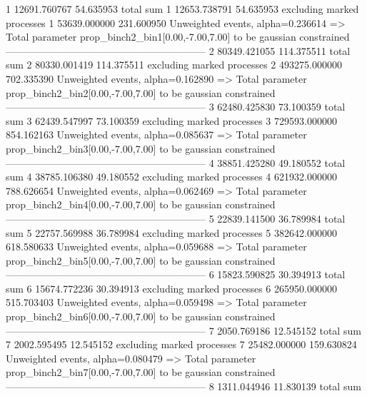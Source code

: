 1          12691.760767    54.635953       total sum                     
1          12653.738791    54.635953       excluding marked processes    
1          53639.000000    231.600950      Unweighted events, alpha=0.236614
  => Total parameter prop_binch2_bin1[0.00,-7.00,7.00] to be gaussian constrained
------------------------------------------------------------
2          80349.421055    114.375511      total sum                     
2          80330.001419    114.375511      excluding marked processes    
2          493275.000000   702.335390      Unweighted events, alpha=0.162890
  => Total parameter prop_binch2_bin2[0.00,-7.00,7.00] to be gaussian constrained
------------------------------------------------------------
3          62480.425830    73.100359       total sum                     
3          62439.547997    73.100359       excluding marked processes    
3          729593.000000   854.162163      Unweighted events, alpha=0.085637
  => Total parameter prop_binch2_bin3[0.00,-7.00,7.00] to be gaussian constrained
------------------------------------------------------------
4          38851.425280    49.180552       total sum                     
4          38785.106380    49.180552       excluding marked processes    
4          621932.000000   788.626654      Unweighted events, alpha=0.062469
  => Total parameter prop_binch2_bin4[0.00,-7.00,7.00] to be gaussian constrained
------------------------------------------------------------
5          22839.141500    36.789984       total sum                     
5          22757.569988    36.789984       excluding marked processes    
5          382642.000000   618.580633      Unweighted events, alpha=0.059688
  => Total parameter prop_binch2_bin5[0.00,-7.00,7.00] to be gaussian constrained
------------------------------------------------------------
6          15823.590825    30.394913       total sum                     
6          15674.772236    30.394913       excluding marked processes    
6          265950.000000   515.703403      Unweighted events, alpha=0.059498
  => Total parameter prop_binch2_bin6[0.00,-7.00,7.00] to be gaussian constrained
------------------------------------------------------------
7          2050.769186     12.545152       total sum                     
7          2002.595495     12.545152       excluding marked processes    
7          25482.000000    159.630824      Unweighted events, alpha=0.080479
  => Total parameter prop_binch2_bin7[0.00,-7.00,7.00] to be gaussian constrained
------------------------------------------------------------
8          1311.044946     11.830139       total sum                     

